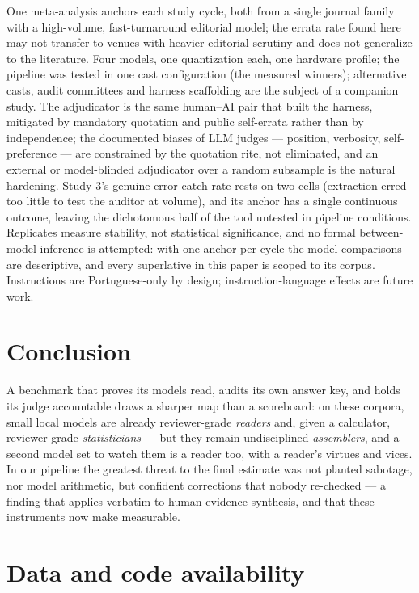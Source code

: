 \documentclass[11pt]{article}
\begin{document}
One meta-analysis anchors each study cycle, both from a single journal family with a high-volume, fast-turnaround editorial model; the errata rate found here may not transfer to venues with heavier editorial scrutiny and does not generalize to the literature. Four models, one quantization each, one hardware profile; the pipeline was tested in one cast configuration (the measured winners); alternative casts, audit committees and harness scaffolding are the subject of a companion study. The adjudicator is the same human--AI pair that built the harness, mitigated by mandatory quotation and public self-errata rather than by independence; the documented biases of LLM judges \citep{zheng2023judging} --- position, verbosity, self-preference --- are constrained by the quotation rite, not eliminated, and an external or model-blinded adjudicator over a random subsample is the natural hardening. Study 3's genuine-error catch rate rests on two cells (extraction erred too little to test the auditor at volume), and its anchor has a single continuous outcome, leaving the dichotomous half of the tool untested in pipeline conditions. Replicates measure stability, not statistical significance, and no formal between-model inference is attempted: with one anchor per cycle the model comparisons are descriptive, and every superlative in this paper is scoped to its corpus. Instructions are Portuguese-only by design; instruction-language effects are future work.

\section{Conclusion}

A benchmark that proves its models read, audits its own answer key, and holds its judge accountable draws a sharper map than a scoreboard: on these corpora, small local models are already reviewer-grade \emph{readers} and, given a calculator, reviewer-grade \emph{statisticians} --- but they remain undisciplined \emph{assemblers}, and a second model set to watch them is a reader too, with a reader's virtues and vices. In our pipeline the greatest threat to the final estimate was not planted sabotage, nor model arithmetic, but confident corrections that nobody re-checked --- a finding that applies verbatim to human evidence synthesis, and that these instruments now make measurable.

\section*{Data and code availability}
\end{document}
